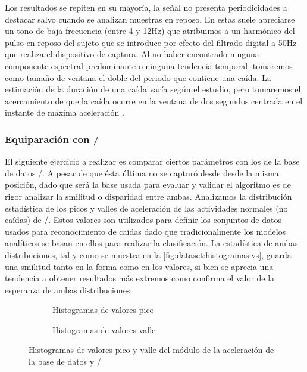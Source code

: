 Los resultados se repiten en su mayoría, la señal no presenta periodicidades a destacar salvo cuando se analizan muestras en reposo. En estas suele apreciarse un tono de baja frecuencia (entre 4 y 12Hz) que atribuimos a un harmónico del pulso en reposo del sujeto que se introduce por efecto del filtrado digital a 50Hz que realiza el dispositivo de captura. Al no haber encontrado ninguna componente espectral predominante o ninguna tendencia temporal, tomaremos como tamaño de ventana el doble del periodo que contiene una caída. La estimación de la duración de una caída varía según el estudio, pero tomaremos el acercamiento de que la caída ocurre en la ventana de dos segundos centrada en el instante de máxima aceleración \cite{Sucerquia2017}. 

\subsubsection{Equiparación con \sisfall/}

El siguiente ejercicio a realizar es comparar ciertos parámetros con los de la base de datos \ifell/.  A pesar de que ésta última no se capturó desde desde la misma posición, dado que será la base usada para evaluar y validar el algoritmo es de rigor analizar la smilitud o disparidad entre ambas. Analizamos la distribución estadística de los picos y valles de aceleración de las actividades normales (no caídas) de \sisfall/. Estos valores son utilizados para definir los conjuntos de datos usados para reconocimiento de caídas dado que tradicionalmente los modelos analíticos se basan en ellos para realizar la clasificación. La estadística de ambas distribuciones, tal y como se muestra en la \autoref{fig:dataset:histogramas:vs}, guarda una smilitud tanto en la forma como en los valores, si bien se aprecia una tendencia a obtener resultados más extremos como confirma el valor de la esperanza de ambas distribuciones.

  \begin{figure}[htb!]
    \centering
    \begin{subfigure}[b]{0.45\textwidth}
      \centering
      \caption{\label{fig:dataset:histoUp} Histogramas de valores pico}
    \end{subfigure}
    \hfill
    \begin{subfigure}[b]{0.45\textwidth}
      \centering
      \caption{\label{fig:dataset:histoLow} Histogramas de valores valle}
    \end{subfigure}
    \caption{\label{fig:dataset:histogramas:vs} Histogramas de valores pico y valle del módulo de la aceleración de la base de datos y \sisfall/}
  \end{figure}



